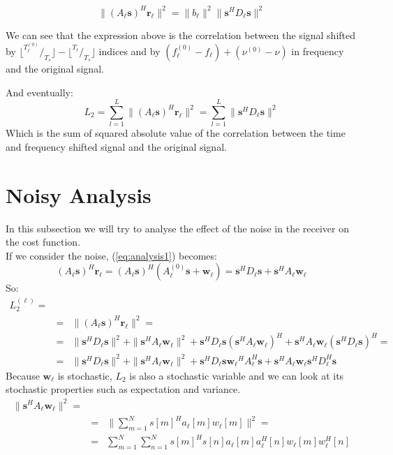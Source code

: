 \documentclass[10pt,a4paper]{report}
\begin{document}
\begin{equation}
\|(A_\ell\mathbf{s})^H\mathbf{r_\ell}\|^2 = \|b_\ell\|^2\|\mathbf{s}^H D_\ell \mathbf{s}\|^2
\end{equation}

We can see that the expression above is the correlation between the signal shifted by $\lfloor ^{T_\ell^{(0)}}/_{T_s} \rfloor- \lfloor ^{T_\ell}/_{T_s} \rfloor$ indices and by $(f^{(0)}_\ell-f_\ell)+(\nu^{(0)}-\nu)$ in frequency and the original signal.

And eventually:
\begin{equation}
L_2 = \sum_{l=1}^L \|(A_\ell\mathbf{s})^H\mathbf{r_\ell}\|^2 = \sum_{l=1}^L \|\mathbf{s}^H D_\ell \mathbf{s}\|^2
\end{equation}
Which is the sum of squared absolute value of the correlation between the time and frequency shifted signal and the original signal.

\section{Noisy Analysis}
In this subsection we will try to analyse the effect of the noise in the receiver on the
cost function.
\\
If we consider the noise, (\ref{eq:analysis1}) becomes:
\begin{equation}
(A_\ell\mathbf{s})^H\mathbf{r_\ell}=(A_\ell\mathbf{s})^H(A^{(0)}_\ell \mathbf{s}+\mathbf{w_\ell})=\mathbf{s}^H D_\ell \mathbf{s}+ \mathbf{s}^H A_\ell \mathbf{w_\ell}
\end{equation}
So:
\begin{eqnarray}
L_2^{(\ell)}= \\
&=& \|(A_\ell\mathbf{s})^H\mathbf{r_\ell}\|^2 = \nonumber\\ 
&=&\|\mathbf{s}^H D_\ell \mathbf{s}\|^2+\|\mathbf{s}^H A_\ell \mathbf{w_\ell}\|^2 + \mathbf{s}^H D_\ell \mathbf{s}(\mathbf{s}^H A_\ell \mathbf{w_\ell})^H + \mathbf{s}^H A_\ell \mathbf{w_\ell}(\mathbf{s}^H D_\ell \mathbf{s})^H = 
\nonumber \\ 
&=& \|\mathbf{s}^H D_\ell \mathbf{s}\|^2+\|\mathbf{s}^H A_\ell \mathbf{w_\ell}\|^2 + \mathbf{s}^H D_\ell \mathbf{s}\mathbf{w_\ell}^H A_\ell^H \mathbf{s} + \mathbf{s}^H A_\ell \mathbf{w_\ell}\mathbf{s}^H D_\ell^H \mathbf{s} \nonumber
\end{eqnarray}
Because $\mathbf{w_\ell}$ is stochastic, $L_2$ is also a stochastic variable and we can look at its
stochastic properties such as expectation and variance.
\begin{eqnarray}
\|\mathbf{s}^H A_\ell \mathbf{w_\ell}\|^2 = \\
&=& \| \sum_{m=1}^N{s[m]^H a_\ell[m] w_\ell[m]}\|^2 = \nonumber \\
&=&\sum_{m=1}^N\sum_{n=1}^N s[m]^H s[n] a_\ell[m] a_\ell^H[n] w_\ell[m] w_\ell^H[n] \nonumber
\end{eqnarray}
\end{document}
